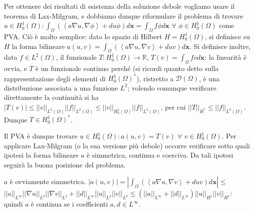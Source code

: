 \documentclass{article}
\begin{document}
Per ottenere dei risultati di esistenza della soluzione debole vogliamo
usare il teorema di Lax-Milgram, e dobbiamo dunque riformulare il problema
di trovare $u\in H_{0}^{1}\left( \Omega \right) :\int_{\Omega }\left(
\left\langle a\nabla u,\nabla \phi \right\rangle +du\phi \right) d\mathbf{x}%
=\int_{\Omega }f\phi d\mathbf{x}$ $\forall $ $\phi \in H_{0}^{1}\left(
\Omega \right) $ come PVA. Ci\`{o} \`{e} molto semplice: dato lo spazio di
Hilbert $H=H_{0}^{1}\left( \Omega \right) $, si definisce su $H$ la forma
bilineare $a\left( u,v\right) =\int_{\Omega }\left( \left\langle a\nabla
u,\nabla v\right\rangle +duv\right) d\mathbf{x}$. Si definisce inoltre, data $f\in
L^{2}\left( \Omega \right) $, il funzionale $T:H_{0}^{1}\left( \Omega
\right) \rightarrow 
\mathbb{R}
$, $T\left( v\right) =\int_{\Omega }fvd\mathbf{x}$: la linearit\`{a} \`{e}
ovvia, e $T$ \`{e} un funzionale continuo perch\'{e} (si ricordi quanto
detto sulla rappresentazione degli elementi di $H_{0}^{1}\left( \Omega
\right) ^{\ast }$), ristretto a $\mathcal{D}\left( \Omega \right) $, \`{e}
una distribuzione associata a una funzione $L^{2}$; volendo comunque
verificare direttamente la continuit\`{a} si ha $\left\vert T\left( v\right)
\right\vert \leq \left\vert \left\vert v\right\vert \right\vert
_{L^{2}\left( \Omega \right) }\left\vert \left\vert f\right\vert \right\vert
_{L^{2}\left( \Omega \right) }\leq \left\vert \left\vert v\right\vert
\right\vert _{H_{0}^{1}\left( \Omega \right) }\left\vert \left\vert
f\right\vert \right\vert _{L^{2}\left( \Omega \right) }$, per cui $%
\left\vert \left\vert T\right\vert \right\vert _{H^{\ast }}\leq \left\vert
\left\vert f\right\vert \right\vert _{L^{2}\left( \Omega \right) }$. Dunque $%
T\in H_{0}^{1}\left( \Omega \right) ^{\ast }$.

Il PVA \`{e} dunque trovare $u\in H_{0}^{1}\left( \Omega \right) :a\left(
u,v\right) =T\left( v\right) $ $\forall $ $v\in H_{0}^{1}\left( \Omega
\right) $. Per applicare Lax-Milgram (o la sua versione pi\`{u} debole)
occorre verificare sotto quali ipotesi la forma bilineare $a$ \`{e}
simmetrica, continua e coerciva. Da tali ipotesi seguir\`{a} la buona
posizione del problema.

$a$ \`{e} ovviamente simmetrica. $\left\vert a\left( u,v\right) \right\vert
=\left\vert \int_{\Omega }\left( \left\langle a\nabla u,\nabla
v\right\rangle +duv\right) d\mathbf{x}\right\vert \leq $ $\left\vert
\left\vert a\right\vert \right\vert _{L^{\infty }}\left\vert \left\vert
\nabla u\right\vert \right\vert _{L^{2}}\left\vert \left\vert \nabla
v\right\vert \right\vert _{L^{2}}+\left\vert \left\vert d\right\vert
\right\vert _{L^{\infty }}\left\vert \left\vert u\right\vert \right\vert
_{L^{2}}\left\vert \left\vert v\right\vert \right\vert _{L^{2}}\leq \left(
\left\vert \left\vert a\right\vert \right\vert _{L^{\infty }}+\left\vert
\left\vert d\right\vert \right\vert _{L^{\infty }}\right) \left\vert
\left\vert u\right\vert \right\vert _{H^{1}}\left\vert \left\vert
v\right\vert \right\vert _{H^{1}}$: quindi $a$ \`{e} continua se i
coefficienti $a,d\in L^{\infty }$.
\end{document}
